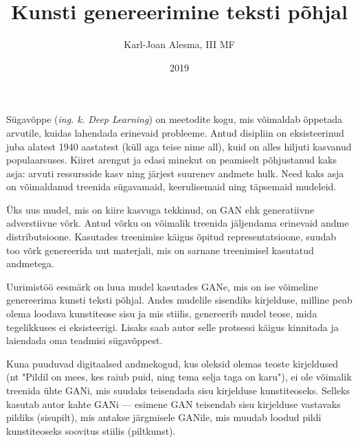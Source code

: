 \documentclass{vilgym}
\title{Kunsti genereerimine teksti põhjal}
\author{Karl-Joan Alesma, III MF}
\date{2019}
\begin{document}
	\maketitle
	\tableofcontents



	\newcommand*{\ingk}[1]{(\textit{ing. k. #1})}

	Sügavõppe \ingk{Deep Learning} on meetodite kogu, mis võimaldab õppetada arvutile, kuidas lahendada erinevaid probleeme. Antud disipliin on eksisteerinud juba alatest 1940 aastatest (küll aga teise nime all), kuid on alles hiljuti kasvanud populaarsuses. Kiiret arengut ja edasi minekut on peamiselt põhjustanud kaks asja: arvuti ressursside kasv ning järjest suurenev andmete hulk. Need kaks asja on võimaldanud treenida sügavamaid, keerulisemaid ning täpsemaid mudeleid. \parencite{deeplearningbook}	 

	Üks uus mudel, mis on kiire kasvuga tekkinud, on GAN ehk generatiivne adverstiivne võrk. Antud võrku on võimalik treenida jäljendama erinevaid andme distributsioone. Kasutades treenimise käigus õpitud representatsioone, suudab too võrk genereerida uut materjali, mis on sarnane treenimisel kasutatud andmetega. \parencite{gan}

	Uurimistöö eesmärk on luua mudel kasutades GANe, mis on ise võimeline genereerima kunsti teksti põhjal. Andes mudelile sisendiks kirjelduse, milline peab olema loodava kunstiteose sisu ja mis stiilis, genereerib mudel teose, mida tegelikkuses ei eksisteerigi. Lisaks saab autor selle protsessi käigus kinnitada ja laiendada oma teadmisi sügavõppest.

	Kuna puuduvad digitaalsed andmekogud, kus oleksid olemas teoste kirjeldused (nt "Pildil on mees, kes raiub puid, ning tema selja taga on karu"), ei ole võimalik treenida ühte GANi, mis suudaks teisendada sisu kirjelduse kunstiteoseks. Selleks kasutab autor kahte GANi --- esimene GAN teisendab sisu kirjelduse vastavaks pildiks (sisu\textrightarrow pilt), mis antakse järgmisele GANile, mis muudab loodud pildi kunstiteoseks soovitus stiilis (pilt\textrightarrow kunst).
\end{document}
